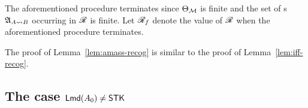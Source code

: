 \medskip

The aforementioned procedure terminates since $\Theta_{\mathcal{M} }$ is finite and the set of {\NFA}s ${\mathfrak{A} }_{A\rightsquigarrow B}$ occurring in $\mathscr{R}$ is finite.
Let $\mathscr{R}_f$ denote the value of $\mathscr{R}$ when the aforementioned procedure terminates. 

The proof of Lemma~\ref{lem:amass-recog} is similar to the proof of Lemma~\ref{lem:iff-recog}.


\subsection{The case ${\sf Lmd}(A_0) \neq \mathsf{STK}$}\label{sec:amass-nostk}



